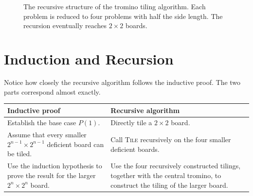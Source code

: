 \documentclass[12pt]{article}
\begin{document}
\begin{figure}[ht]
\centering


\caption{The recursive structure of the tromino tiling algorithm.
Each problem is reduced to four problems with half the side length.
The recursion eventually reaches $2\times2$ boards.}
\label{fig:tromino-recursion}
\end{figure}


\section{Induction and Recursion}

Notice how closely the recursive algorithm follows the inductive proof.
The two parts correspond almost exactly.

\begin{center}
\renewcommand{\arraystretch}{1.5}
\begin{tabular}{|p{}|p{}|}
\hline
\textbf{Inductive proof} & \textbf{Recursive algorithm}\\
\hline

Establish the base case $P(1)$.
&
Directly tile a $2\times2$ board.
\\
\hline

Assume that every smaller $2^{n-1}\times2^{n-1}$ deficient board can
be tiled.
&
Call \textsc{Tile} recursively on the four smaller deficient boards.
\\
\hline

Use the induction hypothesis to prove the result for the larger
$2^n\times2^n$ board.
&
Use the four recursively constructed tilings, together with the
central tromino, to construct the tiling of the larger board.
\\
\hline
\end{tabular}
\end{center}
\end{document}

